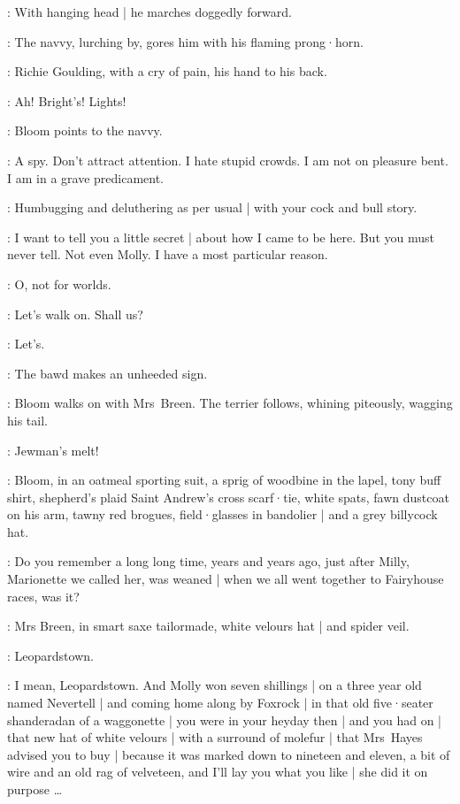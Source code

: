 :
With hanging head |
he marches doggedly forward.

:
The navvy,
lurching by,
gores him with his flaming prong·horn.

:
Richie Goulding,
with a cry of pain,
his hand to his back.

\Richie:
Ah!
Bright's!
Lights!

:
Bloom points to the navvy.

\Bloom:
A spy.
Don't attract attention.
I hate stupid crowds.
I am not on pleasure bent.
I am in a grave predicament.

\MrsBreen:
Humbugging and deluthering as per usual |
with your cock and bull story.

\Bloom:
I want to tell you a little secret |
about how I came to be here.
But you must never tell.
Not even Molly.
I have a most particular reason.

\MrsBreen:
O,
not for worlds.

\Bloom:
Let's walk on.
Shall us?

\MrsBreen:
Let's.

:
The bawd makes an unheeded sign.

:
Bloom walks on with Mrs~Breen.
The terrier follows,
whining piteously,
wagging his tail.

\Bawd[1]:
Jewman's melt!

:
Bloom,
in an oatmeal sporting suit,
a sprig of woodbine in the lapel,
tony buff shirt,
shepherd's plaid Saint Andrew's cross scarf·tie,
white spats,
fawn dustcoat on his arm,
tawny red brogues,
field·glasses in bandolier |
and a grey billycock hat.

\Bloom:
Do you remember a long long time,
years and years ago,
just after Milly,
Marionette we called her,
was weaned |
when we all went together to Fairyhouse races,
was it?

:
Mrs Breen,
in smart saxe tailormade,
white velours hat |
and spider veil.

\MrsBreen:
Leopardstown.

\Bloom:
I mean,
Leopardstown.
And Molly won seven shillings |
on a three year old named Nevertell |
and coming home along by Foxrock |
in that old five·seater shanderadan of a waggonette |
you were in your heyday then  |
and you had on |
that new hat of white velours |
with a surround of molefur |
that Mrs~Hayes
advised you to buy |
because it was marked down to nineteen and eleven,
a bit of wire and an old rag of velveteen,
and I'll lay you what you like |
she did it on purpose \ldots

